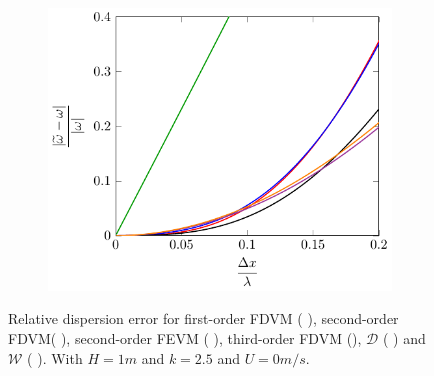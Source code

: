 \begin{figure}
\begin{subfigure}{0.5\textwidth}
		\includegraphics[width=\textwidth]{./chp4/figures/Dispu0khFillz.pdf}
	\end{subfigure}
	\caption{Relative dispersion error for first-order FDVM ({\color{green!60!black} \solidrule}), second-order FDVM({\color{red} \solidrule}), second-order FEVM ({\color{blue} \solidrule}), third-order FDVM ({\solidrule}), $\mathcal{D}$ ({\color{violet!80!white} \solidrule}) and $\mathcal{W}$ ({\color{orange} \solidrule}). With $H = 1m$  and $k = 2.5$ and $U = 0m/s$.}
	\label{fig:Dispu0Fill}
\end{figure}

